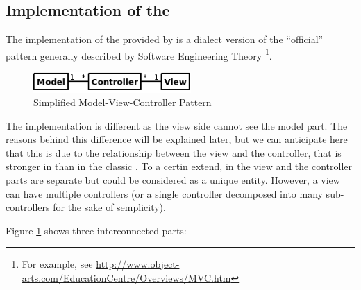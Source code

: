 \subsection{\label{MVC} Implementation of the \mvc}

The implementation of the \mvc provided by \pygtkmvc is a dialect 
version of the ``official'' pattern generally described by Software
Engineering Theory \footnote{For example, see
  \url{http://www.object-arts.com/EducationCentre/Overviews/MVC.htm}}.

\begin{figure}[htbp]
\begin{center}
\includegraphics[width=6cm]{figs/png/mvc}
\caption{\label{MVC_f}Simplified Model-View-Controller Pattern}
\end{center}
\end{figure}
The implementation is different as the view side cannot see the model
part. The reasons behind this difference will be explained later, but
we can anticipate here that this is due to the relationship between
the view and the controller, that is stronger in \pygtkmvc than in the
classic \mvc. To a certin extend, in \pygtkmvc the view and the
controller parts are separate but could be considered as a unique
entity. However, a view can have multiple controllers (or a single
controller decomposed into many sub-controllers for the sake of
semplicity).

\smallskip

Figure \ref{MVC_f} shows three interconnected parts:

